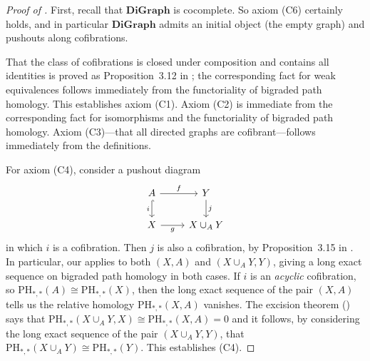 \documentclass[a4paper, 11 pt, oneside, reqno]{amsart}
\numberwithin{lemma}{section}
\theoremstyle{definition}
\newcommand{\cn}[1]{\mathbf{#1}}
\newcommand{\PH}{\mathrm{PH}}
\begin{document}
\begin{proof}[Proof of ]
First, recall that \(\cn{DiGraph}\) is cocomplete.
So axiom (C6) certainly holds, and in particular \(\cn{DiGraph}\) admits an initial object (the empty graph) and pushouts along cofibrations.

That the class of cofibrations is closed under composition and contains all identities is proved as Proposition~3.12 in \cite{CDKOSW}; the corresponding fact for weak equivalences follows immediately from the functoriality of bigraded path homology. This establishes axiom (C1). Axiom (C2) is immediate from the corresponding fact for isomorphisms and the functoriality of bigraded path homology. Axiom (C3)---that all directed graphs are cofibrant---follows immediately from the definitions.

For axiom (C4), consider a pushout diagram
\[\begin{tikzcd}
    A \arrow{r}{f} \arrow[hook,swap]{d}{i} & Y \arrow{d}{j} \\
    X \arrow[swap]{r}{g} & X \cup_A Y
\end{tikzcd}\]
in which \(i\) is a cofibration. Then \(j\) is also a cofibration, by Proposition~3.15 in \cite{CDKOSW}. In particular, our  applies to both \((X,A)\) and \((X \cup_A Y, Y)\), giving a long exact sequence on bigraded path homology in both cases. If \(i\) is an \emph{acyclic} cofibration, so \(\PH_{\ast,\ast}(A) \cong \PH_{\ast,\ast}(X)\), then the long exact sequence of the pair \((X,A)\) tells us the relative homology \(\PH_{\ast,\ast}(X,A)\) vanishes. The excision theorem () says that \(\PH_{\ast,\ast}(X \cup_A Y, X) \cong \PH_{\ast,\ast}(X,A) = 0\) and it follows, by considering the long exact sequence of the pair \((X \cup_A Y, Y)\), that \(\PH_{\ast,\ast}(X \cup_A Y) \cong \PH_{\ast,\ast}(Y)\). This establishes (C4).


\end{proof}
\end{document}
